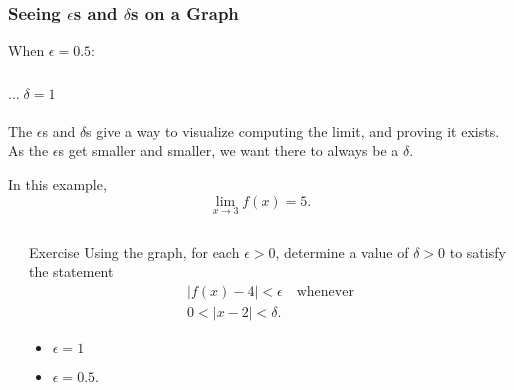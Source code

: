 \documentclass[14pt]{beamer}
\begin{document}
\begin{frame}
\frametitle{Seeing $\epsilon$s and $\delta$s on a Graph}
\small When $\epsilon=0.5$:

\vspace{-1pc}
\begin{columns}[T]
\begin{column}{.5\textwidth}
\begin{block}
\end{block}
\end{column}
\begin{column}{.5\textwidth}
\begin{block}
\end{block}
\end{column}
\end{columns}
\flushright $\dots\;\delta=1$
\end{frame}

\begin{frame}
\frametitle{}
The $\epsilon$s and $\delta$s give a way to visualize computing the limit, and proving it exists.  As the $\epsilon$s get smaller and smaller, we want there to always be a $\delta$.  

\vspace{1pc}
In this example,
\[\lim_{x\to 3}f(x)=5.\]
\end{frame}

\begin{frame}
\begin{columns}[T]
	\begin{column}{.5\textwidth}
		\begin{block}
		\end{block}
	\end{column}
	\begin{column}{.5\textwidth}
		\begin{block}
		{Exercise} \footnotesize Using the graph, for each $\epsilon>0$, determine a value of $\delta>0$ to satisfy the statement
		\begin{multline*}|f(x)-4|<\epsilon\quad\text{whenever} \\
			0<|x-2|<\delta.\end{multline*}  
		\vspace{-1pc}
		\begin{itemize}
		\item $\epsilon=1$ 
		\item $\epsilon=0.5$.
		\end{itemize}
		\end{block}
	\end{column}
\end{columns}
\end{frame} 
\end{document}
